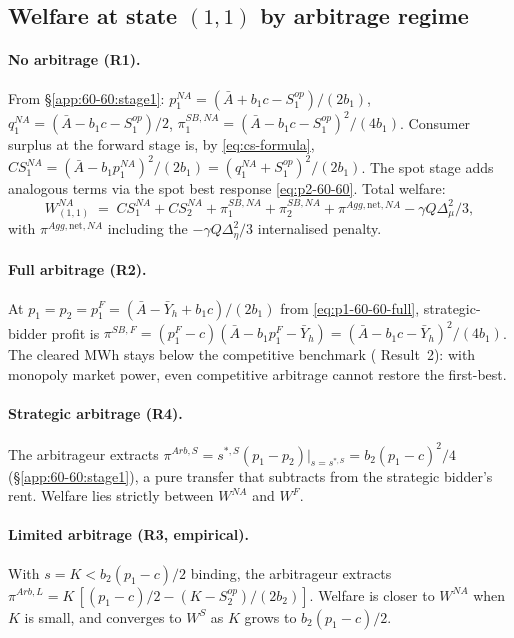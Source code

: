 \documentclass[11pt]{article}
\begin{document}
\subsection{Welfare at state $(1,1)$ by arbitrage regime}\label{app:welfare:1-1}

\paragraph{No arbitrage (R1).} From \S\ref{app:60-60:stage1}: $p_1^{NA} = (\bar A + b_1 c - S^{op}_1)/(2 b_1)$, $q_1^{NA} = (\bar A - b_1 c - S^{op}_1)/2$, $\pi^{SB,NA}_1 = (\bar A - b_1 c - S^{op}_1)^2/(4 b_1)$. Consumer surplus at the forward stage is, by \eqref{eq:cs-formula}, $CS^{NA}_1 = (\bar A - b_1 p_1^{NA})^2/(2 b_1) = (q_1^{NA} + S^{op}_1)^2/(2 b_1)$. The spot stage adds analogous terms via the spot best response \eqref{eq:p2-60-60}. Total welfare:
\[
W^{NA}_{(1,1)} \;=\; CS^{NA}_1 + CS^{NA}_2 + \pi^{SB,NA}_1 + \pi^{SB,NA}_2 + \pi^{Agg,\text{net},NA} - \gamma Q \Delta_\mu^2/3,
\]
with $\pi^{Agg,\text{net},NA}$ including the $-\gamma Q \Delta_\eta^2/3$ internalised penalty.

\paragraph{Full arbitrage (R2).} At $p_1 = p_2 = p_1^{F} = (\bar A - \bar Y_h + b_1 c)/(2 b_1)$ from \eqref{eq:p1-60-60-full}, strategic-bidder profit is $\pi^{SB,F} = (p_1^F - c)(\bar A - b_1 p_1^F - \bar Y_h) = (\bar A - b_1 c - \bar Y_h)^2/(4 b_1)$. The cleared MWh stays below the competitive benchmark (\citeauthor{ito_reguant_2016} Result~2): with monopoly market power, even competitive arbitrage cannot restore the first-best.

\paragraph{Strategic arbitrage (R4).} The arbitrageur extracts $\pi^{Arb,S} = s^{*,S}(p_1 - p_2)|_{s = s^{*,S}} = b_2(p_1 - c)^2/4$ (\S\ref{app:60-60:stage1}), a pure transfer that subtracts from the strategic bidder's rent. Welfare lies strictly between $W^{NA}$ and $W^{F}$.

\paragraph{Limited arbitrage (R3, empirical).} With $s = K < b_2(p_1 - c)/2$ binding, the arbitrageur extracts $\pi^{Arb,L} = K\, [(p_1 - c)/2 - (K - S^{op}_2)/(2 b_2)]$. Welfare is closer to $W^{NA}$ when $K$ is small, and converges to $W^{S}$ as $K$ grows to $b_2(p_1-c)/2$.
\end{document}
